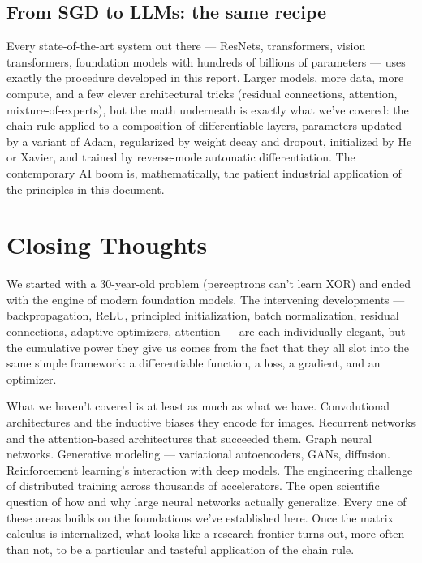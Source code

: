 \documentclass[11pt, a4paper]{article}
\let\oldsection\section
\renewcommand{\section}{\clearpage\oldsection}
\begin{document}
\subsection{From SGD to LLMs: the same recipe}

Every state-of-the-art system out there --- ResNets, transformers, vision transformers, foundation models with hundreds of billions of parameters --- uses exactly the procedure developed in this report. Larger models, more data, more compute, and a few clever architectural tricks (residual connections, attention, mixture-of-experts), but the math underneath is exactly what we've covered: the chain rule applied to a composition of differentiable layers, parameters updated by a variant of Adam, regularized by weight decay and dropout, initialized by He or Xavier, and trained by reverse-mode automatic differentiation. The contemporary AI boom is, mathematically, the patient industrial application of the principles in this document.

\section{Closing Thoughts}

We started with a 30-year-old problem (perceptrons can't learn XOR) and ended with the engine of modern foundation models. The intervening developments --- backpropagation, ReLU, principled initialization, batch normalization, residual connections, adaptive optimizers, attention --- are each individually elegant, but the cumulative power they give us comes from the fact that they all slot into the same simple framework: a differentiable function, a loss, a gradient, and an optimizer.

What we haven't covered is at least as much as what we have. Convolutional architectures and the inductive biases they encode for images. Recurrent networks and the attention-based architectures that succeeded them. Graph neural networks. Generative modeling --- variational autoencoders, GANs, diffusion. Reinforcement learning's interaction with deep models. The engineering challenge of distributed training across thousands of accelerators. The open scientific question of how and why large neural networks actually generalize. Every one of these areas builds on the foundations we've established here. Once the matrix calculus is internalized, what looks like a research frontier turns out, more often than not, to be a particular and tasteful application of the chain rule.
\end{document}

